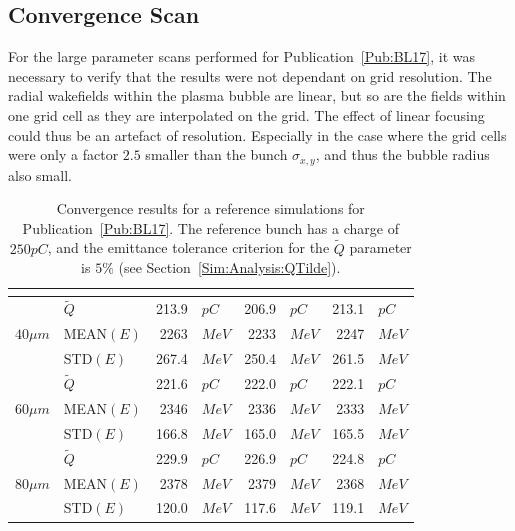 \subsection{Convergence Scan}
\label{Sim:Converge}

For the large parameter scans performed for Publication~\ref{Pub:BL17}, it was necessary to verify that the results were not dependant on grid resolution.
The radial wakefields within the plasma bubble are linear, but so are the fields within one grid cell as they are interpolated on the grid.
The effect of linear focusing could thus be an artefact of resolution.
Especially in the case where the grid cells were only a factor $2.5$ smaller than the bunch $\sigma_{x,y}$, and thus the bubble radius also small.

\begin{table}[hbt]
    \centering
    \caption{Convergence results for a reference simulations for Publication~\ref{Pub:BL17}.
    The reference bunch has a charge of $250\unit{pC}$, and the emittance tolerance criterion for the $\tilde{Q}$ parameter is $5\%$ (see Section~\ref{Sim:Analysis:QTilde}).}
    \label{T:Converg}
    \begin{tabularx}{132mm}{Xl d{1}l d{1}l d{1}l}
         & 
            & 
            & 
            &  \\
        \hline
                         & $\tilde{Q}$ &  213.9 & $\unit{pC}$  &  206.9 & $\unit{pC}$  &  213.1 & $\unit{pC}$  \\
        $40\unit{\mu m}$ & MEAN$(E)$   & 2263   & $\unit{MeV}$ & 2233   & $\unit{MeV}$ & 2247   & $\unit{MeV}$ \\
                         & STD$(E)$    &  267.4 & $\unit{MeV}$ &  250.4 & $\unit{MeV}$ &  261.5 & $\unit{MeV}$ \\
        \hline
                         & $\tilde{Q}$ &  221.6 & $\unit{pC}$  &  222.0 & $\unit{pC}$  &  222.1 & $\unit{pC}$  \\
        $60\unit{\mu m}$ & MEAN$(E)$   & 2346   & $\unit{MeV}$ & 2336   & $\unit{MeV}$ & 2333   & $\unit{MeV}$ \\
                         & STD$(E)$    &  166.8 & $\unit{MeV}$ &  165.0 & $\unit{MeV}$ &  165.5 & $\unit{MeV}$ \\
        \hline
                         & $\tilde{Q}$ &  229.9 & $\unit{pC}$  &  226.9 & $\unit{pC}$  &  224.8 & $\unit{pC}$  \\
        $80\unit{\mu m}$ & MEAN$(E)$   & 2378   & $\unit{MeV}$ & 2379   & $\unit{MeV}$ & 2368   & $\unit{MeV}$ \\
                         & STD$(E)$    &  120.0 & $\unit{MeV}$ &  117.6 & $\unit{MeV}$ &  119.1 & $\unit{MeV}$ \\
    \end{tabularx}
\end{table}

